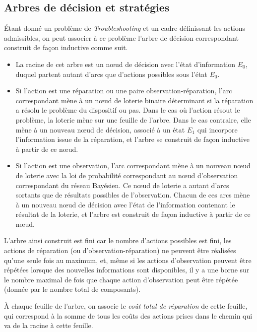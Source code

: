 \documentclass[a4paper,11pt]{article}
\theoremstyle{plain}
\theoremstyle{definition}
\begin{document}
\subsection{Arbres de décision et stratégies}
\label{SecArbresEtStrategies}

Étant donné un problème de \emph{Troubleshooting} et un cadre définissant les actions admissibles, on peut associer à ce problème l'arbre de décision correspondant construit de façon inductive comme suit.

\begin{itemize}
\item La racine de cet arbre est un nœud de décision avec l'état d'information $E_0$, duquel partent autant d'arcs que d'actions possibles sous l'état $E_0$.

\item Si l'action est une réparation ou une paire observation-réparation, l'arc correspondant mène à un nœud de loterie binaire déterminant si la réparation a résolu le problème du dispositif ou pas. Dans le cas où l'action résout le problème, la loterie mène sur une feuille de l'arbre. Dans le cas contraire, elle mène à un nouveau nœud de décision, associé à un état $E_1$ qui incorpore l'information issue de la réparation, et l'arbre se construit de façon inductive à partir de ce nœud.

\item Si l'action est une observation, l'arc correspondant mène à un nouveau nœud de loterie avec la loi de probabilité correspondant au nœud d'observation correspondant du réseau Bayésien. Ce nœud de loterie a autant d'arcs sortants que de résultats possibles de l'observation. Chacun de ces arcs mène à un nouveau nœud de décision avec l'état de l'information contenant le résultat de la loterie, et l'arbre est construit de façon inductive à partir de ce nœud.
\end{itemize}

L'arbre ainsi construit est fini car le nombre d'actions possibles est fini, les actions de réparation (ou d'observation-réparation) ne peuvent être réalisées qu'une seule fois au maximum, et, même si les actions d'observation peuvent être répétées lorsque des nouvelles informations sont disponibles, il y a une borne sur le nombre maximal de fois que chaque action d'observation peut être répétée (donnée par le nombre total de composants).

À chaque feuille de l'arbre, on associe le \emph{coût total de réparation} de cette feuille, qui correspond à la somme de tous les coûts des actions prises dans le chemin qui va de la racine à cette feuille.
\end{document}
